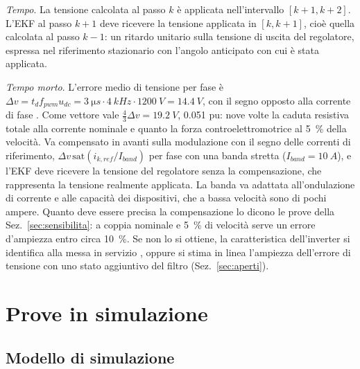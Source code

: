 \documentclass[10pt,a4paper]{scrartcl}
\begin{document}
\begin{onehalfspace}
\emph{Tempo}. La tensione calcolata al passo $k$ è applicata nell'intervallo $[k+1, k+2]$. L'EKF al passo $k+1$ deve ricevere la tensione applicata in $[k, k+1]$, cioè quella calcolata al passo $k-1$: un ritardo unitario sulla tensione di uscita del regolatore, espressa nel riferimento stazionario con l'angolo anticipato con cui è stata applicata.

\emph{Tempo morto}. L'errore medio di tensione per fase è $\Delta v = t_d f_{pwm} u_{dc} = \SI{3}{\micro s}\cdot\SI{4}{kHz}\cdot\SI{1200}{V} = \SI{14.4}{V}$, con il segno opposto alla corrente di fase \cite{pwrdeadtime}. Come vettore vale $\tfrac43\Delta v = \SI{19.2}{V}$, \num{0.051} pu: nove volte la caduta resistiva totale alla corrente nominale e quanto la forza controelettromotrice al \SI{5}{\percent} della velocità. Va compensato in avanti sulla modulazione con il segno delle correnti di riferimento, $\Delta v\,\mathrm{sat}(i_{k,ref}/I_{band})$ per fase con una banda stretta ($I_{band} = \SI{10}{A}$), e l'EKF deve ricevere la tensione del regolatore senza la compensazione, che rappresenta la tensione realmente applicata. La banda va adattata all'ondulazione di corrente e alle capacità dei dispositivi, che a bassa velocità sono di pochi ampere. Quanto deve essere precisa la compensazione lo dicono le prove della Sez.~\ref{sec:sensibilita}: a coppia nominale e \SI{5}{\percent} di velocità serve un errore d'ampiezza entro circa \SI{10}{\percent}. Se non lo si ottiene, la caratteristica dell'inverter si identifica alla messa in servizio \cite{holtz2002b}, oppure si stima in linea l'ampiezza dell'errore di tensione con uno stato aggiuntivo del filtro (Sez.~\ref{sec:aperti}).

\section{Prove in simulazione}
\label{sec:prove}

\subsection{Modello di simulazione}
\label{sec:modellosim}


\end{onehalfspace}
\end{document}
